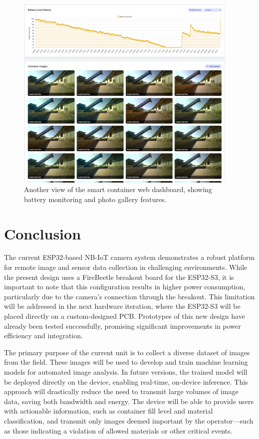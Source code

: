 \documentclass[11pt,a4paper]{article}
\begin{document}

\begin{figure}[h]
    \centering
    \includegraphics[width=0.95\textwidth]{tex_photos/website_container_5_2}
    \caption{Another view of the smart container web dashboard, showing battery monitoring and photo gallery features.}
    \label{fig:website-dashboard-2}
\end{figure}

\section{Conclusion}

The current ESP32-based NB-IoT camera system demonstrates a robust platform for remote image and sensor data collection in challenging environments. While the present design uses a FireBeetle breakout board for the ESP32-S3, it is important to note that this configuration results in higher power consumption, particularly due to the camera's connection through the breakout. This limitation will be addressed in the next hardware iteration, where the ESP32-S3 will be placed directly on a custom-designed PCB. Prototypes of this new design have already been tested successfully, promising significant improvements in power efficiency and integration.

The primary purpose of the current unit is to collect a diverse dataset of images from the field. These images will be used to develop and train machine learning models for automated image analysis. In future versions, the trained model will be deployed directly on the device, enabling real-time, on-device inference. This approach will drastically reduce the need to transmit large volumes of image data, saving both bandwidth and energy. The device will be able to provide users with actionable information, such as container fill level and material classification, and transmit only images deemed important by the operator—such as those indicating a violation of allowed materials or other critical events.
\end{document}
